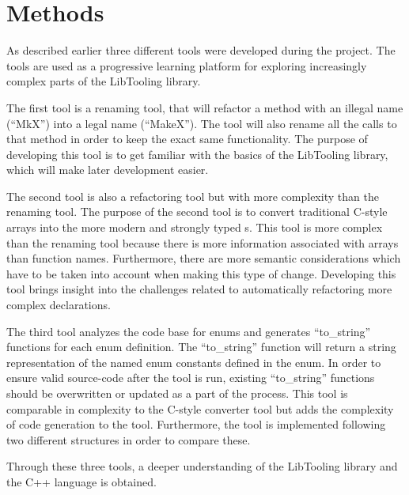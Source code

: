 \section{Methods}
As described earlier three different tools were developed during the project. The tools are used as a progressive learning platform for exploring increasingly complex parts of the LibTooling library. 

The first tool is a renaming tool, that will refactor a method with an illegal name (``MkX'') into a legal name (``MakeX''). The tool will also rename all the calls to that method in order to keep the exact same functionality. The purpose of developing this tool is to get familiar with the basics of the LibTooling library, which will make later development easier. 

The second tool is also a refactoring tool but with more complexity than the renaming tool. The purpose of the second tool is to convert traditional C-style arrays into the more modern and strongly typed s. This tool is more complex than the renaming tool because there is more information associated with arrays than function names. Furthermore, there are more semantic considerations which have to be taken into account when making this type of change.
Developing this tool brings insight into the challenges related to automatically refactoring more complex declarations.

The third tool analyzes the code base for enums and generates ``to\_string'' functions for each enum definition. The ``to\_string'' function will return a string representation of the named enum constants defined in the enum. In order to ensure valid source-code after the tool is run, existing ``to\_string'' functions should be overwritten or updated as a part of the process. 
This tool is comparable in complexity to the C-style converter tool but adds the complexity of code generation to the tool.
Furthermore, the tool is implemented following two different structures in order to compare these.

Through these three tools, a deeper understanding of the LibTooling library and the C++ language is obtained.